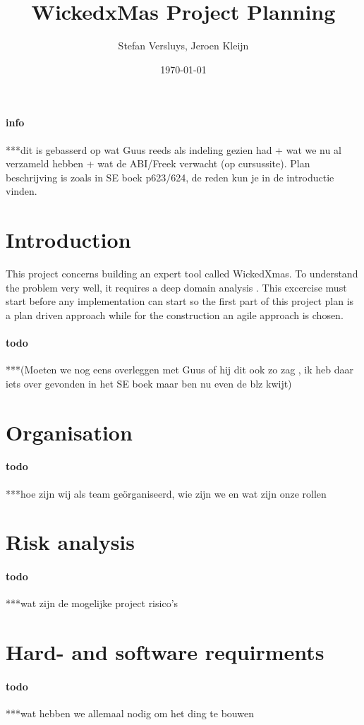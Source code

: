 \documentclass[a4paper,11pt,twoside,draft]{article}
\author{Stefan Versluys, Jeroen Kleijn}
\date{\today}
\title{WickedxMas Project Planning}
\begin{document}
	


\paragraph{info}
***dit is gebasserd op wat Guus reeds als indeling gezien had + wat we nu al verzameld hebben + wat de ABI/Freek verwacht (op cursussite). Plan beschrijving is zoals in SE boek p623/624, de reden kun je in de introductie vinden.

\section{Introduction}
This project concerns building an expert tool called WickedXmas. To understand the problem very well, it requires a deep domain analysis . This excercise must start before any implementation can start so the first part of this project plan is a plan driven approach while for the construction an agile approach is chosen. 

\paragraph{todo}
***(Moeten we nog eens overleggen met Guus of hij dit ook zo zag , ik heb daar iets over gevonden in het SE boek maar ben nu even de blz kwijt) 

\section{Organisation}
\paragraph{todo}
***hoe zijn wij als team geörganiseerd, wie zijn we en wat zijn onze rollen

\section{Risk analysis}
\paragraph{todo}
***wat zijn de mogelijke project risico's

\section{Hard- and software requirments}
\paragraph{todo}
***wat hebben we allemaal nodig om het ding te bouwen
\end{document}
